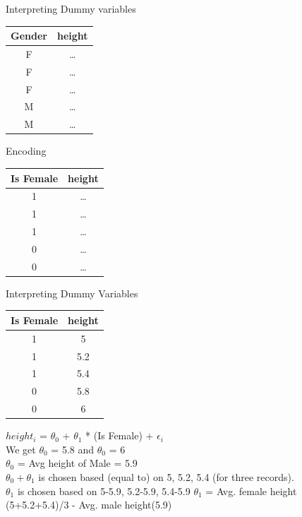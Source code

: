 \documentclass{beamer}
\begin{document}
    \begin{frame}{Interpreting Dummy variables}
    \begin{center}
    \begin{tabular}{c|c}
    Gender& height\\
    \hline
    \hline
    F & \dots \\
    F & \dots \\
    F & \dots \\
    M & \dots \\
    M & \dots \\
    \end{tabular}
    
    \end{center}
    
    \pause Encoding
    
    \begin{center}
    \pause \begin{tabular}{c|c}
    Is Female& height\\
    \hline
    \hline
    1 & \dots \\
    1 & \dots \\
    1 & \dots \\
    0 & \dots \\
    0 & \dots \\
    \end{tabular}
    \end{center}
    
    \end{frame}
    
    \begin{frame}{Interpreting Dummy Variables}
    \begin{center}
        \pause \begin{tabular}{c|c}
            Is Female& height\\
            \hline
            \hline
            1 & 5 \\
            1 & 5.2 \\
            1 & 5.4 \\
            0 & 5.8 \\
            0 & 6 \\
        \end{tabular}
    \end{center}
    \pause $height_{i}$ = $\theta_{0}$ + $\theta_{1}$ *  (Is Female) + $\epsilon_{i}$\\
    \vspace{1em}
    \pause We get $\theta_0$ = 5.8 and $\theta_0$ = 6\\
    \pause $\theta_{0}$ = Avg height of Male = 5.9\\
    \pause $\theta_{0} + \theta_{1}$ is chosen based (equal to) on 5, 5.2, 5.4 (for three records). \\
    \pause $\theta_{1}$ is chosen based on 5-5.9, 5.2-5.9, 5.4-5.9
    \pause $\theta_{1}$ = Avg. female height (5+5.2+5.4)/3 - Avg. male height(5.9)
    \end{frame}
    
\end{document}
